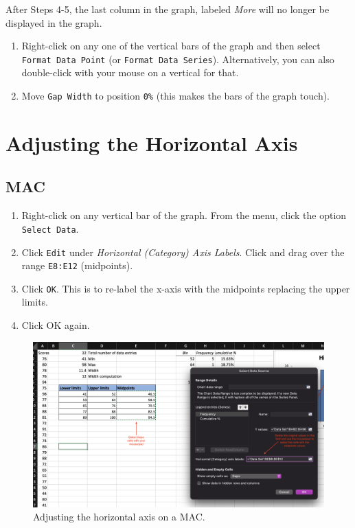 \documentclass[
]{book}
\providecommand{\tightlist}{%
  \setlength{\itemsep}{0pt}\setlength{\parskip}{0pt}}
\begin{document}
After Steps 4-5, the last column in the graph, labeled \emph{More} will no longer be displayed in the graph.

\begin{enumerate}
\def\labelenumi{\arabic{enumi}.}
\setcounter{enumi}{5}
\tightlist
\item
  Right-click on any one of the vertical bars of the graph and then select \texttt{Format\ Data\ Point} (or \texttt{Format\ Data\ Series}). Alternatively, you can also double-click with your mouse on a vertical for that.
\item
  Move \texttt{Gap\ Width} to position \texttt{0\%} (this makes the bars of the graph touch).
\end{enumerate}

\hypertarget{adjusting-the-horizontal-axis}{%
\section{Adjusting the Horizontal Axis}\label{adjusting-the-horizontal-axis}}

\hypertarget{mac}{%
\subsection{MAC}\label{mac}}

\begin{enumerate}
\def\labelenumi{\arabic{enumi}.}
\tightlist
\item
  Right-click on any vertical bar of the graph. From the menu, click the option \texttt{Select\ Data}.
\item
  Click \texttt{Edit} under \emph{Horizontal (Category) Axis Labels}. Click and drag over the range \texttt{E8:E12} (midpoints).
\item
  Click \texttt{OK}. This is to re-label the x-axis with the midpoints replacing the upper limits.
\item
  Click OK again.
\end{enumerate}

\begin{figure}

{\centering \includegraphics[width=1\linewidth]{adjusting-horizontal-axis-mac} 

}

\caption{Adjusting the horizontal axis on a MAC.}\label{fig:adjusting-horizontal-axis-mac}
\end{figure}
\end{document}
